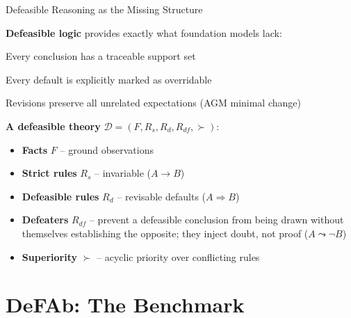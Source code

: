 \documentclass[aspectratio=169]{beamer}
\newcommand{\D}{\mathcal{D}}
\newcommand{\defto}{\Rightarrow}
\newcommand{\strictto}{\rightarrow}
\newcommand{\defeatto}{\leadsto}
\begin{document}
\begin{frame}{Defeasible Reasoning as the Missing Structure}

\small
\textbf{Defeasible logic} provides exactly what foundation models lack:

\vspace{0.2em}
\footnotesize
\begin{description}[labelwidth=2.1cm, leftmargin=2.3cm]
    \item[Grounding] Every conclusion has a traceable support set
    \item[Revisability] Every default is explicitly marked as overridable
    \item[Conservativity] Revisions preserve all unrelated expectations (AGM minimal change)
\end{description}

\small
\vspace{0.2em}
\textbf{A defeasible theory} $\D = (F, R_s, R_d, R_{df}, {\succ})$:
\begin{itemize}\setlength\itemsep{0pt}
    \item \textbf{Facts} $F$ -- ground observations
    \item \textbf{Strict rules} $R_s$ -- invariable ($A \strictto B$)
    \item \textbf{Defeasible rules} $R_d$ -- revisable defaults ($A \defto B$)
    \item \textbf{Defeaters} $R_{df}$ -- prevent a defeasible conclusion from being drawn without themselves establishing the opposite; they inject doubt, not proof ($A \defeatto \neg B$)
    \item \textbf{Superiority} $\succ$ -- acyclic priority over conflicting rules
\end{itemize}
\end{frame}


\section{DeFAb: The Benchmark}
\end{document}
